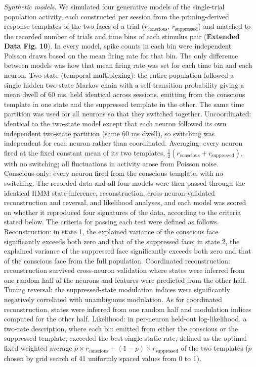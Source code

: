 \documentclass{article}
\begin{document}
\textit{Synthetic models.} We simulated four generative models of the single-trial population activity, each constructed per session from the priming-derived response templates of the two faces of a trial ($r_{\mathrm{conscious}}$, $r_{\mathrm{suppressed}}$) and matched to the recorded number of trials and time bins of each stimulus pair (\textbf{Extended Data Fig. 10}). In every model, spike counts in each bin were independent Poisson draws based on the mean firing rate for that bin. The only difference between models was how that mean firing rate was set for each time bin and each neuron. Two-state (temporal multiplexing): the entire population followed a single hidden two-state Markov chain with a self-transition probability giving a mean dwell of 60 ms, held identical across sessions, emitting from the conscious template in one state and the suppressed template in the other. The same time partition was used for all neurons so that they switched together. Uncoordinated: identical to the two-state model except that each neuron followed its own independent two-state partition (same 60 ms dwell), so switching was independent for each neuron rather than coordinated. Averaging: every neuron fired at the fixed constant mean of its two templates, $\frac{1}{2}(r_{\mathrm{conscious}} + r_{\mathrm{suppressed}})$, with no switching; all fluctuations in activity arose from Poisson noise. Conscious-only: every neuron fired from the conscious template, with no switching. The recorded data and all four models were then passed through the identical HMM state-inference, reconstruction, cross-neuron-validated reconstruction and reversal, and likelihood analyses, and each model was scored on whether it reproduced four signatures of the data, according to the criteria stated below. The criteria for passing each test were defined as follows. Reconstruction: in state 1, the explained variance of the conscious face significantly exceeds both zero and that of the suppressed face; in state 2, the explained variance of the suppressed face significantly exceeds both zero and that of the conscious face from the full population. Coordinated reconstruction: reconstruction survived cross-neuron validation where states were inferred from one random half of the neurons and features were predicted from the other half. Tuning reversal: the suppressed-state modulation indices were significantly negatively correlated with unambiguous modulation. As for coordinated reconstruction, states were inferred from one random half and modulation indices computed for the other half. Likelihood: in per-neuron held-out log-likelihood, a two-rate description, where each bin emitted from either the conscious or the suppressed template, exceeded the best single static rate, defined as the optimal fixed weighted average $p \times r_{\mathrm{conscious}} + (1 - p) \times r_{\mathrm{suppressed}}$ of the two templates ($p$ chosen by grid search of 41 uniformly spaced values from 0 to 1).
\end{document}
